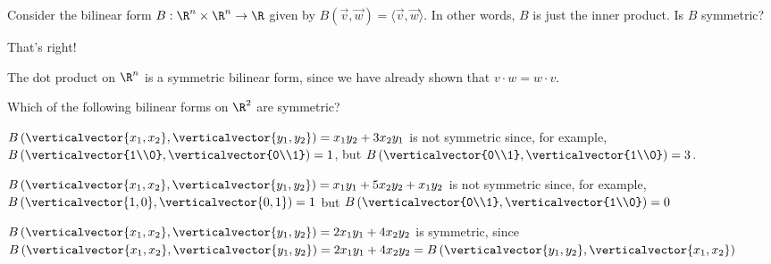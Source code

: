 \documentclass{ximera}
\begin{document}
\begin{question}
  Consider the bilinear form $B : \R^n \times \R^n \to \R$ given by $B(\vec{v},\vec{w}) = \langle \vec{v}, \vec{w} \rangle$.   In other words, $B$ is just the inner product.  Is $B$ symmetric?
  \begin{solution}
    \begin{multiple-choice}
    \end{multiple-choice}
  \end{solution}
  
  That's right!

  \begin{example}
    The dot product on $\R^n$ is a symmetric bilinear form, since we have already shown that $v \cdot w = w \cdot v$.
  \end{example}

  Which of the following bilinear forms on $\R^2$ are symmetric?
  \begin{solution}
    \begin{hint}
      $B\left(\verticalvector{x_1,x_2},\verticalvector{y_1,y_2}\right) = x_1y_2+3x_2y_1$ is not symmetric since, for example,
      $B\left( \verticalvector{1\\0},\verticalvector{0\\1}\right) = 1$, but $B\left( \verticalvector{0\\1},\verticalvector{1\\0}\right) = 3$.
    \end{hint}
    \begin{hint}
      $B\left(\verticalvector{x_1,x_2},\verticalvector{y_1,y_2}\right) = x_1y_1+5x_2y_2+x_1y_2$ is not symmetric since, for example,
      $B\left(\verticalvector{1,0},\verticalvector{0,1}\right) = 1$ but  $B\left( \verticalvector{0\\1},\verticalvector{1\\0}\right) = 0$
    \end{hint}
    \begin{hint}
      $B\left(\verticalvector{x_1,x_2},\verticalvector{y_1,y_2}\right) = 2x_1y_1+4x_2y_2$ is symmetric, since
      $B\left(\verticalvector{x_1,x_2},\verticalvector{y_1,y_2}\right) = 2x_1y_1+4x_2y_2 = B\left(\verticalvector{y_1,y_2}, \verticalvector{x_1,x_2}\right) $
    \end{hint}
    \begin{multiple-choice}
    \end{multiple-choice}
  \end{solution}
\end{question}

\end{document}
